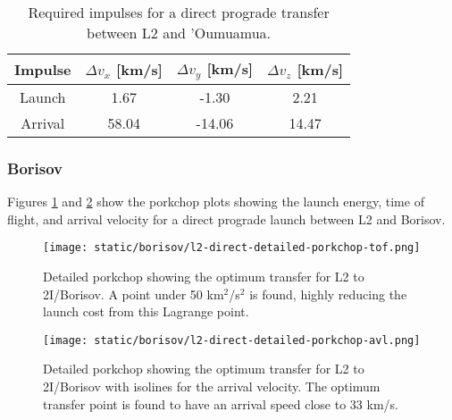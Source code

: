 \vspace{1cm}
\begin{table}[H]
  \centering
  \begin{tabular}{|c|c|c|c|}
    \hline
    Impulse & $\Delta v_x$ [km/s] & $\Delta v_y$ [km/s] & $\Delta v_z$ [km/s] \\
    \hline
    Launch & 1.67 & -1.30 & 2.21 \\
    \hline
    Arrival & 58.04 & -14.06 & 14.47 \\
    \hline
  \end{tabular}
    \caption[Required impulses for a direct prograde transfer between L2 and
    'Oumuamua]{Required impulses for a direct prograde transfer between L2 and
    'Oumuamua.}
  \label{tab:l2-oumuamua-direct-transfer-impulses}
\end{table}


\subsubsection{Borisov}

Figures \ref{fig:l2-borisov-optimum-porkchop} and
\ref{fig:l2-borisov-optimum-porkchop-avl} show the porkchop plots showing the
launch energy, time of flight, and arrival velocity for a direct prograde launch
between L2 and Borisov.

\begin{figure}[H]
  \centering
  \texttt{[image: static/borisov/l2-direct-detailed-porkchop-tof.png]}
        \caption[Detailed porkchop showing the optimum transfer for
        L2 to 2I/Borisov with the time of flight.]{Detailed porkchop showing the optimum transfer for
        L2 to 2I/Borisov. A point under 50 km$^2$/s$^2$ is found, highly
        reducing the launch cost from this Lagrange point.
  }
  \label{fig:l2-borisov-optimum-porkchop}
\end{figure}

\begin{figure}[H]
  \centering
  \texttt{[image: static/borisov/l2-direct-detailed-porkchop-avl.png]}
        \caption[Detailed porkchop showing the optimum transfer for
        L2 to 2I/Borisov with the arrival velocity.]{Detailed porkchop showing the
        optimum transfer for L2 to 2I/Borisov with isolines for the arrival
        velocity. The optimum transfer point is found to have an arrival speed
        close to 33 km/s.}
  \label{fig:l2-borisov-optimum-porkchop-avl}
\end{figure}

